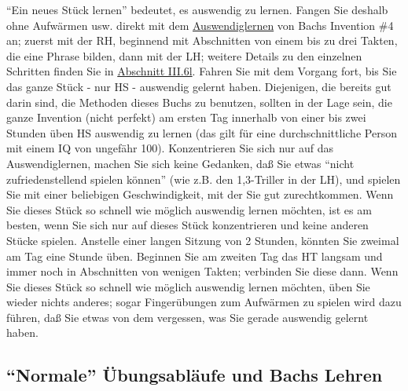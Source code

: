 \enquote{Ein neues Stück lernen} bedeutet, es auswendig zu lernen.
Fangen Sie deshalb ohne Aufwärmen usw. direkt mit dem \hyperlink{c1iii6}{Auswendiglernen} von Bachs Invention \#4 an; zuerst mit der RH, beginnend mit Abschnitten von einem bis zu drei Takten, die eine Phrase bilden, dann mit der LH; weitere Details zu den einzelnen Schritten finden Sie in \hyperlink{c1iii6l}{Abschnitt III.6l}.
Fahren Sie mit dem Vorgang fort, bis Sie das ganze Stück - nur HS - auswendig gelernt haben.
Diejenigen, die bereits gut darin sind, die Methoden dieses Buchs zu benutzen, sollten in der Lage sein, die ganze Invention (nicht perfekt) am ersten Tag innerhalb von einer bis zwei Stunden üben HS auswendig zu lernen (das gilt für eine durchschnittliche Person mit einem IQ von ungefähr 100).
Konzentrieren Sie sich nur auf das Auswendiglernen, machen Sie sich keine Gedanken, daß Sie etwas \enquote{nicht zufriedenstellend spielen können} (wie z.B. den 1,3-Triller in der LH), und spielen Sie mit einer beliebigen Geschwindigkeit, mit der Sie gut zurechtkommen.
Wenn Sie dieses Stück so schnell wie möglich auswendig lernen möchten, ist es am besten, wenn Sie sich nur auf dieses Stück konzentrieren und keine anderen Stücke spielen.
Anstelle einer langen Sitzung von 2 Stunden, könnten Sie zweimal am Tag eine Stunde üben.
Beginnen Sie am zweiten Tag das HT langsam und immer noch in Abschnitten von wenigen Takten; verbinden Sie diese dann.
Wenn Sie dieses Stück so schnell wie möglich auswendig lernen möchten, üben Sie wieder nichts anderes; sogar Fingerübungen zum Aufwärmen zu spielen wird dazu führen, daß Sie etwas von dem vergessen, was Sie gerade auswendig gelernt haben.


\subsection{\enquote{Normale} Übungsabläufe und Bachs Lehren}\hypertarget{c1iii19c}{}  

